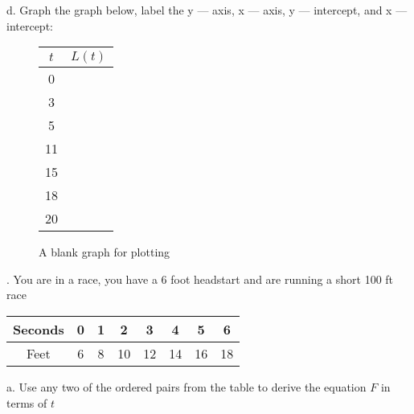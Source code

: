 \documentclass{article}
\begin{document}
\noindent d. Graph the graph below, label the y --- axis, x --- axis, y --- intercept, and x --- intercept:
\vspace{1em} %

\begin{figure}[htbp]
    \begin{minipage}[t]{0.6\textwidth}
        \centering
        \caption*{A blank graph for plotting} %
    \end{minipage}
    \begin{minipage}[t]{0.4\textwidth}
        \centering
        \begin{tabular}{|c|c|}
            \hline
            $t$ & $L(t)$ \\
            \hline
            0 & \\
            \hline
            3 & \\
            \hline
            5 & \\
            \hline
            11 & \\
            \hline
            15 & \\
            \hline
            18 & \\
            \hline
            20 & \\
            \hline
        \end{tabular}
    \end{minipage}
\end{figure}

\vspace{2em} %

. You are in a race, you have a 6 foot headstart and are running a short 100 ft race
\vspace{1em}

\begin{center}
    \begin{tabular}{|c|c|c|c|c|c|c|c|}
        \hline
        Seconds & 0 & 1 & 2 & 3 & 4 & 5 & 6 \\
        \hline
        Feet & 6 & 8 & 10 & 12 & 14 & 16 & 18 \\
        \hline
    \end{tabular}
\end{center}

\noindent a. Use any two of the ordered pairs from the table to derive the equation $F$ in terms of $t$
\end{document}
